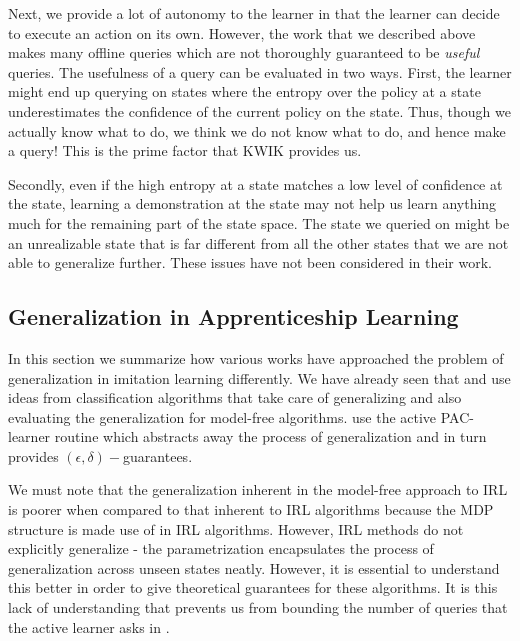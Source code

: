  Next, we provide a lot of autonomy to the learner in that the learner can decide to execute an action on its own. However, the work that we described above makes many offline queries which are not thoroughly guaranteed to be \textit{useful} queries. The usefulness of a query can be evaluated in two ways. First, the learner might end up querying on states where  the entropy over the policy at a state underestimates the confidence of the current policy on the state. Thus, though we actually know what to do, we think we do not know what to do, and hence make a query! This is the prime factor that KWIK provides us.
 
 Secondly, even if the high entropy at a state matches a low level of confidence at the state, learning a demonstration at the state may not help us learn anything much for the remaining part of the state space.  The state we queried on might be an unrealizable state that is far different from all the other states that we are not able to generalize further. These issues have not been considered in their work. \\



\subsection{Generalization in Apprenticeship Learning}
In this section we summarize how various works have approached the problem of generalization in imitation learning differently. We have already seen that \citet{Chernova:2009:IPL:1622716.1622717} and \citet{Chernova:2007:CPL:1329125.1329407} use ideas from classification algorithms that take care of generalizing and also evaluating the generalization for model-free algorithms. \citet{DBLP:journals/corr/abs-1210-4876} use the active PAC-learner routine which abstracts away the process of generalization and in turn provides $(\epsilon, \delta)-$guarantees. 

We must note that the generalization inherent in the model-free approach to IRL is poorer when compared to that inherent to IRL algorithms because the MDP structure is made  use of in IRL algorithms.  However, IRL methods do not explicitly generalize - the parametrization encapsulates the process of generalization across unseen states neatly.  However, it is essential to understand this better in order to give theoretical guarantees for these algorithms. It is this lack of understanding that prevents us from bounding the number of queries that the active learner asks in \citet{Lopes:2009:ALR:1617459.1617463}. \\



